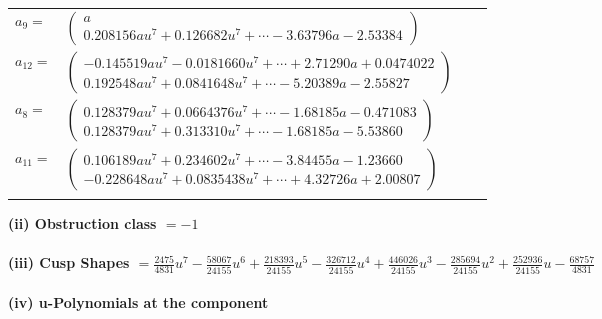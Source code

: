\documentclass[1p]{elsarticle_modified}
\theoremstyle{definition}
\begin{document}
\begin{tabular}{m{7pt} m{180pt} m{7pt} m{180pt} }
\flushright $a_{9}=$&$\begin{pmatrix}a\\0.208156 a u^{7}+0.126682 u^{7}+\cdots-3.63796 a-2.53384\end{pmatrix}$ \\
\flushright $a_{12}=$&$\begin{pmatrix}-0.145519 a u^{7}-0.0181660 u^{7}+\cdots+2.71290 a+0.0474022\\0.192548 a u^{7}+0.0841648 u^{7}+\cdots-5.20389 a-2.55827\end{pmatrix}$ \\
\flushright $a_{8}=$&$\begin{pmatrix}0.128379 a u^{7}+0.0664376 u^{7}+\cdots-1.68185 a-0.471083\\0.128379 a u^{7}+0.313310 u^{7}+\cdots-1.68185 a-5.53860\end{pmatrix}$ \\
\flushright $a_{11}=$&$\begin{pmatrix}0.106189 a u^{7}+0.234602 u^{7}+\cdots-3.84455 a-1.23660\\-0.228648 a u^{7}+0.0835438 u^{7}+\cdots+4.32726 a+2.00807\end{pmatrix}$\\&\end{tabular}
\flushleft \textbf{(ii) Obstruction class $= -1$}\\~\\
\flushleft \textbf{(iii) Cusp Shapes $= \frac{2475}{4831} u^7-\frac{58067}{24155} u^6+\frac{218393}{24155} u^5-\frac{326712}{24155} u^4+\frac{446026}{24155} u^3-\frac{285694}{24155} u^2+\frac{252936}{24155} u-\frac{68757}{4831}$}\\~\\
\newpage\renewcommand{\arraystretch}{1}
\flushleft \textbf{(iv) u-Polynomials at the component}\newline \\
\end{document}

